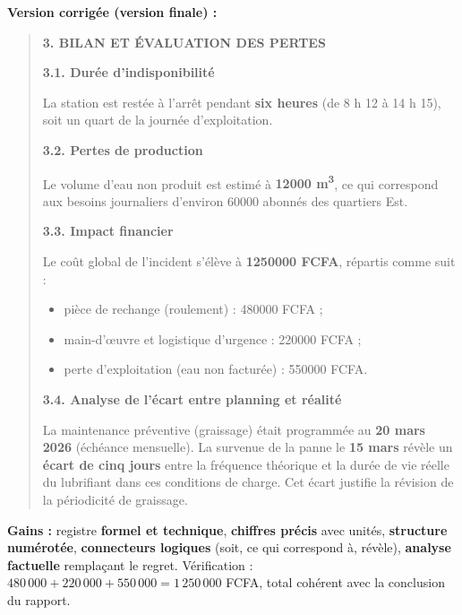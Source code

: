 \documentclass[11pt]{article}
\begin{document}
\begin{exoresolu}
    \textbf{Version corrigée (version finale) :}
    \begin{quote}
    \textbf{3. BILAN ET ÉVALUATION DES PERTES}

    \textbf{3.1. Durée d'indisponibilité}

    La station est restée à l'arrêt pendant \textbf{six heures} (de 8 h 12 à 14 h 15), soit un quart de la journée d'exploitation.

    \textbf{3.2. Pertes de production}

    Le volume d'eau non produit est estimé à \textbf{\num{12000} m\textsuperscript{3}}, ce qui correspond aux besoins journaliers d'environ \num{60000} abonnés des quartiers Est.

    \textbf{3.3. Impact financier}

    Le coût global de l'incident s'élève à \textbf{\num{1250000} FCFA}, répartis comme suit :
    \begin{itemize}
        \item pièce de rechange (roulement) : \num{480000} FCFA ;
        \item main-d'œuvre et logistique d'urgence : \num{220000} FCFA ;
        \item perte d'exploitation (eau non facturée) : \num{550000} FCFA.
    \end{itemize}

    \textbf{3.4. Analyse de l'écart entre planning et réalité}

    La maintenance préventive (graissage) était programmée au \textbf{20 mars 2026} (échéance mensuelle). La survenue de la panne le \textbf{15 mars} révèle un \textbf{écart de cinq jours} entre la fréquence théorique et la durée de vie réelle du lubrifiant dans ces conditions de charge. Cet écart justifie la révision de la périodicité de graissage.
    \end{quote}
    \textbf{Gains :} registre \textbf{formel et technique}, \textbf{chiffres précis} avec unités, \textbf{structure numérotée}, \textbf{connecteurs logiques} (\og soit\fg, \og ce qui correspond à\fg, \og révèle\fg), \textbf{analyse factuelle} remplaçant le regret. Vérification : $480\,000 + 220\,000 + 550\,000 = 1\,250\,000$ FCFA, total cohérent avec la conclusion du rapport.
\end{exoresolu}
\end{document}
